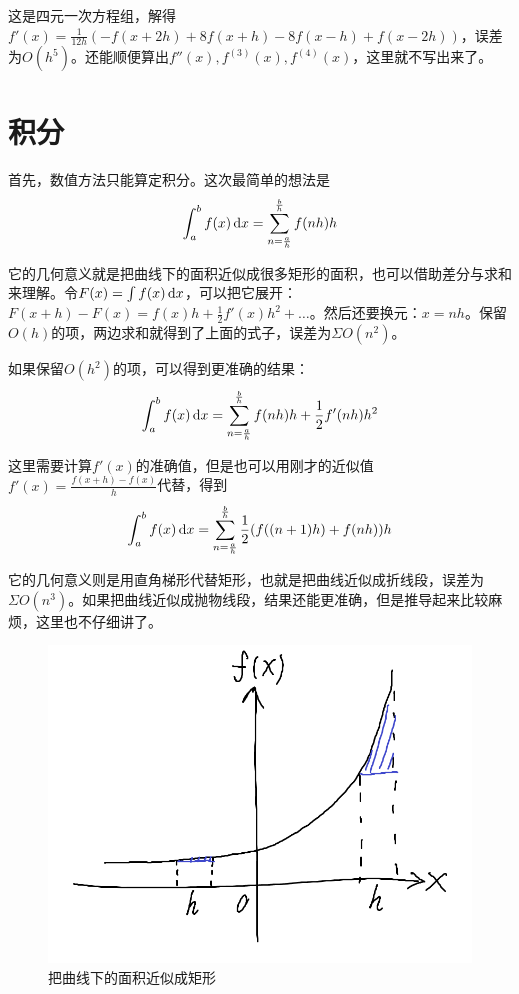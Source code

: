 这是四元一次方程组，解得$f'(x)=\frac{1}{12 h}(-f(x+2 h)+8 f(x+h)-8 f(x-h)+f(x-2 h))$，误差为$O(h^5)$。还能顺便算出$f''(x),f^{(3)}(x),f^{(4)}(x)$，这里就不写出来了。
\section{积分}
首先，数值方法只能算定积分。这次最简单的想法是
\begin{equation*}
\int_a^b f(x) \mathop{}\!\mathrm{d} x=\sum_{n=\frac{a}{h}}^{\frac{b}{h}} f(n h) h
\end{equation*}

它的几何意义就是把曲线下的面积近似成很多矩形的面积，也可以借助差分与求和来理解。令$F(x)=\int f(x) \mathop{}\!\mathrm{d} x$，可以把它展开：$F(x+h)-F(x)=f(x) h+\frac{1}{2} f'(x) h^2+\dots$。然后还要换元：$x=n h$。保留$O(h)$的项，两边求和就得到了上面的式子，误差为$\Sigma O(n^2)$。

如果保留$O(h^2)$的项，可以得到更准确的结果：
\begin{equation*}
\int_a^b f(x) \mathop{}\!\mathrm{d} x=\sum_{n=\frac{a}{h}}^{\frac{b}{h}} f(n h) h+\frac{1}{2} f'(n h) h^2
\end{equation*}

这里需要计算$f'(x)$的准确值，但是也可以用刚才的近似值$f'(x)=\frac{f(x+h)-f(x)}{h}$代替，得到
\begin{equation*}
\int_a^b f(x) \mathop{}\!\mathrm{d} x=\sum_{n=\frac{a}{h}}^{\frac{b}{h}} \frac{1}{2} (f((n+1) h)+f(n h)) h
\end{equation*}

它的几何意义则是用直角梯形代替矩形，也就是把曲线近似成折线段，误差为$\Sigma O(n^3)$。如果把曲线近似成抛物线段，结果还能更准确，但是推导起来比较麻烦，这里也不仔细讲了。
\begin{figure}[htb]
\centering
\includegraphics[scale=0.5]{fig/adjust-h}
\caption{把曲线下的面积近似成矩形}
\label{fig-adjust-h}
\end{figure}

